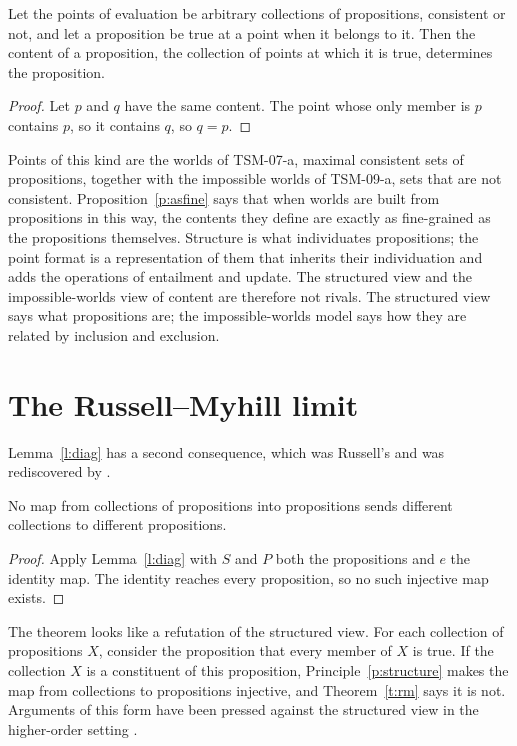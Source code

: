 \documentclass{situationist-preprint}
\begin{document}
\begin{proposition}\label{p:asfine}
Let the points of evaluation be arbitrary collections of propositions, consistent or not, and let a proposition be true at a point when it belongs to it. Then the content of a proposition, the collection of points at which it is true, determines the proposition.
\end{proposition}

\begin{proof}
Let $p$ and $q$ have the same content. The point whose only member is $p$ contains $p$, so it contains $q$, so $q = p$.
\end{proof}

Points of this kind are the worlds of TSM-07-a, maximal consistent sets of propositions, together with the impossible worlds of TSM-09-a, sets that are not consistent. Proposition~\ref{p:asfine} says that when worlds are built from propositions in this way, the contents they define are exactly as fine-grained as the propositions themselves. Structure is what individuates propositions; the point format is a representation of them that inherits their individuation and adds the operations of entailment and update. The structured view and the impossible-worlds view of content are therefore not rivals. The structured view says what propositions are; the impossible-worlds model says how they are related by inclusion and exclusion.

\section{The Russell--Myhill limit}\label{s:rm}

Lemma~\ref{l:diag} has a second consequence, which was Russell's and was rediscovered by \citet{Myhill1958}.

\begin{theorem}\label{t:rm}
No map from collections of propositions into propositions sends different collections to different propositions.
\end{theorem}

\begin{proof}
Apply Lemma~\ref{l:diag} with $S$ and $P$ both the propositions and $e$ the identity map. The identity reaches every proposition, so no such injective map exists.
\end{proof}

The theorem looks like a refutation of the structured view. For each collection of propositions $X$, consider the proposition that every member of $X$ is true. If the collection $X$ is a constituent of this proposition, Principle~\ref{p:structure} makes the map from collections to propositions injective, and Theorem~\ref{t:rm} says it is not. Arguments of this form have been pressed against the structured view in the higher-order setting \citep{Dorr2016,Goodman2017}.
\end{document}
